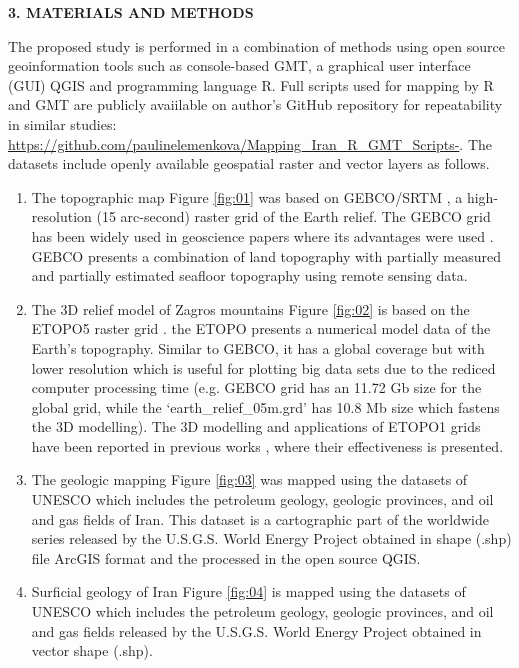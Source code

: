 \documentclass[12pt,a4paper,oneside]{article}
\def \newsection{\vspace{12pt}\textbf}
\def \newpar{\vspace{6pt}}
\begin{document}
\newsection {3. MATERIALS AND METHODS}

\newpar The proposed study is performed in a combination of methods using open source geoinformation tools such as console-based GMT, a graphical user interface (GUI) QGIS and programming language R. Full scripts used for mapping by R and GMT are publicly avaiilable on author's GitHub repository for repeatability in similar studies: \href{https://github.com/paulinelemenkova/Mapping_Iran_R_GMT_Scripts-}{https://github.com/paulinelemenkova/Mapping\_Iran\_R\_GMT\_Scripts-}. The datasets include openly available geospatial raster and vector layers as follows. 

\begin{enumerate}  
	\item The topographic map Figure \ref{fig:01} was based on GEBCO/SRTM \citep{GEBCO}, a high-resolution (15 arc-second) raster grid of the Earth relief. The GEBCO grid has been widely used in geoscience papers where its advantages were used \citep{Lemenkova2020c,Lemenkova2020d,Lemenkova202112,Lindh}. GEBCO presents a combination of land topography with partially measured and partially estimated seafloor topography using remote sensing data. 
	\item The 3D relief model of Zagros mountains Figure \ref{fig:02} is based on the ETOPO5 raster grid \citep{AmanteEakins}. the ETOPO presents a numerical model data of the Earth’s topography. Similar to GEBCO, it has a global coverage but with lower resolution which is useful for plotting big data sets due to the rediced computer processing time (e.g. GEBCO grid has an 11.72 Gb size for the global grid, while the ‘earth\_relief\_05m.grd’ has 10.8 Mb size which fastens the 3D modelling). The 3D modelling and applications of ETOPO1 grids have been reported in previous works \citep{Lemenkova2020e,Verard,Spooner,Lemenkova202017}, where their effectiveness is presented. 
	\item The geologic mapping Figure \ref{fig:03} was mapped using the datasets of UNESCO which includes the petroleum geology, geologic provinces, and oil and gas fields of Iran. This dataset is a cartographic part of the worldwide series released by the U.S.G.S. World Energy Project obtained in shape (.shp) file ArcGIS format and the processed in the open source QGIS.
	\item Surficial geology of Iran Figure \ref{fig:04} is mapped using the datasets of UNESCO which includes the petroleum geology, geologic provinces, and oil and gas fields released by the U.S.G.S. World Energy Project obtained in vector shape (.shp).

\end{enumerate}
\end{document}
